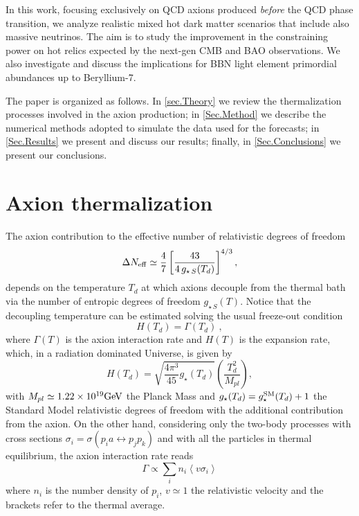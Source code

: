 \documentclass[fleqn,usenatbib,letters]{mnras}
\begin{document}
In this work, focusing exclusively on QCD axions produced \textit{before} the QCD phase transition, we analyze realistic mixed hot dark matter scenarios that include also massive neutrinos. The aim is to study the improvement in the constraining power on hot relics expected by the next-gen CMB and BAO observations. We also investigate and discuss the implications for BBN light element primordial abundances up to Beryllium-7. 

The paper is organized as follows. In \autoref{sec.Theory} we review the thermalization processes involved in the axion production; in \autoref{Sec.Method} we describe the numerical methods adopted to simulate the data used for the forecasts; in \autoref{Sec.Results} we present and discuss our results; finally, in \autoref{Sec.Conclusions} we present our conclusions.

\section{Axion thermalization}\label{sec.Theory}
The axion contribution to the effective number of relativistic degrees of freedom 
\begin{equation}
 \Delta N_{\rm eff}  \simeq \frac{4}{7} \left[ \frac{43}{4\,g_{\star\,S}(T_{d})}\right]^{4/3},
\end{equation}
depends on the temperature $T_d$ at which axions decouple from the thermal bath via the number of entropic degrees of freedom $g_{\star\,S}(T)$. Notice that the decoupling temperature can be estimated solving the usual freeze-out condition
\begin{equation}
H(T_d)=\Gamma(T_{d})~,   
\end{equation}
where $\Gamma(T)$ is the axion interaction rate and $H(T)$ is the expansion rate, which, in a radiation dominated Universe, is given by
\begin{equation}
H(T_d)=\sqrt{\frac{4 \pi^{3}}{45} g_{\star}(T_d)} \left(\frac{T_d^{2}}{M_{p l}}\right),
\end{equation}
with $M_{pl}\simeq 1.22 \times 10^{19} \rm{GeV}$ the Planck Mass and $g_{\star}(T_d)=g_{\star}^{\rm SM}(T_d)+1$ the Standard Model relativistic degrees of freedom with the additional contribution from the axion. On the other hand, considering only the two-body processes with cross sections $\sigma_i = \sigma(p_i a \leftrightarrow p_jp_k)$ and with all the particles in thermal equilibrium, the axion interaction rate reads~\citep{Melchiorri:2007cd}
\begin{equation}
\Gamma \propto \sum_{i} n_{i}\left\langle v \sigma_{i}\right\rangle
\end{equation}
where $n_i$ is the number density of $p_i$, $v\simeq 1$ the relativistic velocity and the brackets refer to the thermal average. 
\end{document}
